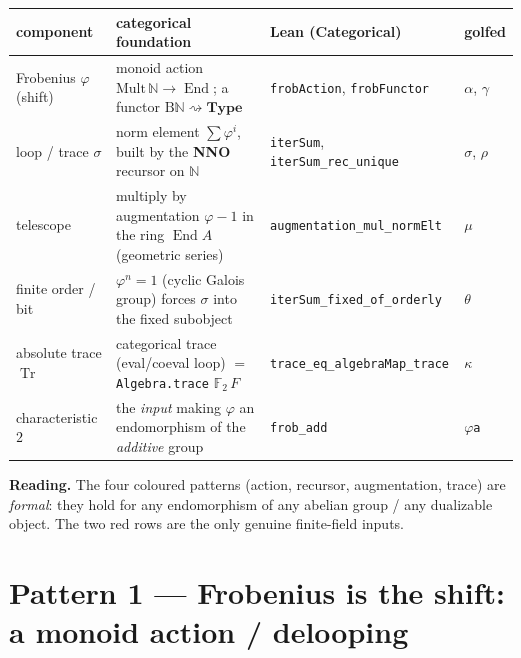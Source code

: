 \documentclass[11pt]{article}
\newcommand{\lc}[1]{\texttt{\small #1}}
\newcommand{\Tr}{\operatorname{Tr}}
\newcommand{\Nn}{\mathbb{N}}
\newcommand{\End}{\operatorname{End}}
\newcommand{\B}{\mathrm{B}}
\begin{document}
\begin{center}\small
\renewcommand{\arraystretch}{1.35}
\begin{tabular}{@{}p{3.1cm}p{6.4cm}p{3.0cm}p{2.0cm}@{}}
\hline
\textbf{component} & \textbf{categorical foundation} & \textbf{Lean (Categorical)} & \textbf{golfed}\\
\hline
\textcolor{cAct}{Frobenius $\varphi$ (shift)} &
  monoid action $\mathrm{Mult}\,\Nn \to \End$; a functor $\B\Nn\rightsquigarrow\mathbf{Type}$ &
  \lc{frobAction}, \lc{frobFunctor} & \lc{$\alpha$}, \lc{$\gamma$}\\
\textcolor{cNNO}{loop / trace $\sigma$} &
  norm element $\sum\varphi^{i}$, built by the \textbf{NNO} recursor on $\Nn$ &
  \lc{iterSum}, \lc{iterSum\_rec\_unique} & \lc{$\sigma$}, \lc{$\rho$}\\
\textcolor{cRing}{telescope} &
  multiply by augmentation $\varphi-1$ in the ring $\End A$ (geometric series) &
  \lc{augmentation\_mul\_normElt} & \lc{$\mu$}\\
\textcolor{cInp}{finite order / bit} &
  $\varphi^{n}=1$ (cyclic Galois group) forces $\sigma$ into the fixed subobject &
  \lc{iterSum\_fixed\_of\_orderly} & \lc{$\theta$}\\
\textcolor{cTr}{absolute trace $\Tr$} &
  categorical trace (eval/coeval loop) $=$ \lc{Algebra.trace} $\mathbb{F}_2\,F$ &
  \lc{trace\_eq\_algebraMap\_trace} & \lc{$\kappa$}\\
\textcolor{cInp}{characteristic $2$} &
  the \emph{input} making $\varphi$ an endomorphism of the \emph{additive} group &
  \lc{frob\_add} & \lc{$\varphi$a}\\
\hline
\end{tabular}
\end{center}

\begin{note}
\textbf{Reading.} The four coloured patterns (\textcolor{cAct}{action},
\textcolor{cNNO}{recursor}, \textcolor{cRing}{augmentation},
\textcolor{cTr}{trace}) are \emph{formal}: they hold for any endomorphism of any
abelian group / any dualizable object. The two \textcolor{cInp}{red} rows are the
only genuine finite-field inputs.
\end{note}

\section{Pattern 1 --- Frobenius is the shift: a monoid action / delooping}
\end{document}
